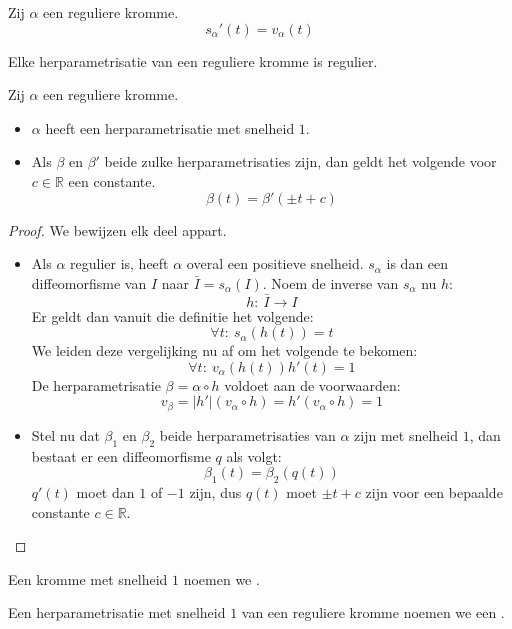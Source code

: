 \documentclass[main.tex]{subfiles}
\begin{document}
\begin{st}
  Zij $\alpha$ een reguliere kromme.
  \[ s_{\alpha}'(t) = v_{\alpha}(t) \]
\end{st}

\begin{st}
  Elke herparametrisatie van een reguliere kromme is regulier.
  \zb
\end{st}

\begin{st}
  Zij $\alpha$ een reguliere kromme.
  \begin{itemize}
  \item $\alpha$ heeft een herparametrisatie met snelheid $1$.
  \item Als $\beta$ en $\beta'$ beide zulke
    herparametrisaties zijn, dan geldt het volgende voor $c\in \mathbb{R}$ een constante.
    \[ \beta(t) = \beta'(\pm t + c) \]
  \end{itemize}

  \begin{proof}
    We bewijzen elk deel appart.
    \begin{itemize}
    \item 
      Als $\alpha$ regulier is, heeft $\alpha$ overal een positieve snelheid.
      $s_{\alpha}$ is dan een diffeomorfisme van $I$ naar $\bar{I} = s_{\alpha}(I)$.
      Noem de inverse van $s_{\alpha}$ nu $h$:
      \[ h:\ \bar{I}\rightarrow I \] Er geldt dan vanuit die definitie
      het volgende:
      \[ \forall t:\ s_{\alpha}(h(t)) = t \] We leiden deze vergelijking
      nu af om het volgende te bekomen:
      \[ \forall t:\ v_{\alpha}(h(t))h'(t) = 1 \] De herparametrisatie
      $\beta = \alpha \circ h$ voldoet aan de voorwaarden:
      \[ v_{\beta} = |h'|(v_{\alpha} \circ h) = h'(v_{\alpha} \circ h) =
      1\]
    \item Stel nu dat $\beta_{1}$ en $\beta_{2}$ beide herparametrisaties van $\alpha$ zijn met snelheid $1$, dan bestaat er een diffeomorfisme $q$ als volgt:
      \[ \beta_{1}(t) = \beta_{2}(q(t))\]
      $q'(t)$ moet dan $1$ of $-1$ zijn, dus $q(t)$ moet $\pm t + c$ zijn voor een bepaalde constante $c\in \mathbb{R}$.
    \end{itemize}
  \end{proof}
\end{st}

\begin{de}
  Een kromme met snelheid $1$ noemen we .
\end{de}
\begin{de}
  Een herparametrisatie met snelheid $1$ van een reguliere kromme noemen we een .
\end{de}
\end{document}
